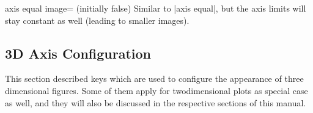 \begin{pgfplotskey}{axis equal image= (initially false)}
	Similar to |axis equal|, but the axis limits will stay constant as well (leading to smaller images).
\begin{codeexample}[]
\hspace{1cm}
\end{codeexample}
	
\begin{codeexample}[]
\hspace{1cm}
\end{codeexample}
\end{pgfplotskey}

\subsection{3D Axis Configuration}
This section described keys which are used to configure the appearance of three dimensional figures. Some of them apply for twodimensional plots as special case as well, and they will also be discussed in the respective sections of this manual.

